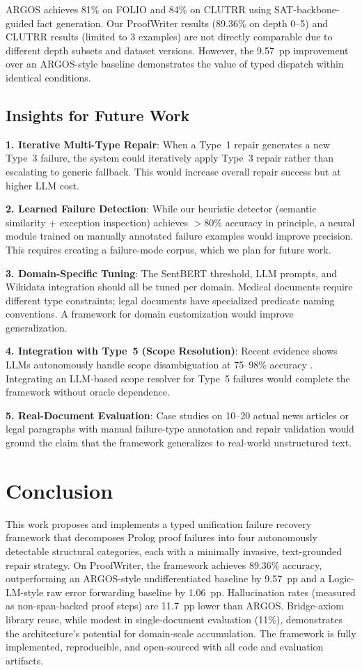 \documentclass[11pt,letterpaper]{article}
\begin{document}
ARGOS \citep{Cotnareanu2026} achieves 81\% on FOLIO and 84\% on CLUTRR using SAT-backbone-guided fact generation. Our ProofWriter results (89.36\% on depth 0--5) and CLUTRR results (limited to 3 examples) are not directly comparable due to different depth subsets and dataset versions. However, the 9.57~pp improvement over an ARGOS-style baseline demonstrates the value of typed dispatch within identical conditions.

\subsection{Insights for Future Work}

\textbf{1. Iterative Multi-Type Repair}: When a Type~1 repair generates a new Type~3 failure, the system could iteratively apply Type~3 repair rather than escalating to generic fallback. This would increase overall repair success but at higher LLM cost.

\textbf{2. Learned Failure Detection}: While our heuristic detector (semantic similarity + exception inspection) achieves $>$80\% accuracy in principle, a neural module trained on manually annotated failure examples would improve precision. This requires creating a failure-mode corpus, which we plan for future work.

\textbf{3. Domain-Specific Tuning}: The SentBERT threshold, LLM prompts, and Wikidata integration should all be tuned per domain. Medical documents require different type constraints; legal documents have specialized predicate naming conventions. A framework for domain customization would improve generalization.

\textbf{4. Integration with Type~5 (Scope Resolution)}: Recent evidence shows LLMs autonomously handle scope disambiguation at 75--98\% accuracy \citep{Brassard2024}. Integrating an LLM-based scope resolver for Type~5 failures would complete the framework without oracle dependence.

\textbf{5. Real-Document Evaluation}: Case studies on 10--20 actual news articles or legal paragraphs with manual failure-type annotation and repair validation would ground the claim that the framework generalizes to real-world unstructured text.

\section{Conclusion}

This work proposes and implements a typed unification failure recovery framework that decomposes Prolog proof failures into four autonomously detectable structural categories, each with a minimally invasive, text-grounded repair strategy. On ProofWriter, the framework achieves 89.36\% accuracy, outperforming an ARGOS-style undifferentiated baseline by 9.57~pp and a Logic-LM-style raw error forwarding baseline by 1.06~pp. Hallucination rates (measured as non-span-backed proof steps) are 11.7~pp lower than ARGOS. Bridge-axiom library reuse, while modest in single-document evaluation (11\%), demonstrates the architecture's potential for domain-scale accumulation. The framework is fully implemented, reproducible, and open-sourced with all code and evaluation artifacts.
\end{document}
